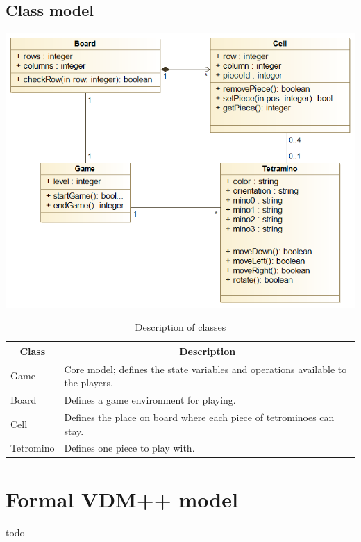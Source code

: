 \documentclass[a4paper]{article}
\begin{document}
\subsection{Class model}

\begin{center}
	\includegraphics[scale=0.4]{resources/img/uml}
	\label{uml}
\end{center}

\begin{table}[!h]
	\centering
	\label{description-classes}
	\begin{tabular}{|l|l|}
	\hline
	\multicolumn{1}{|c|}{\textbf{Class}} & \multicolumn{1}{|c|}{\textbf{Description}}	\\	\hline
	Game	&	Core model; defines the state variables and operations available to the players.	\\	\hline
	Board	&	Defines a game environment for playing. \\	\hline
	Cell	&	Defines the place on board where each piece of tetrominoes can stay. 	\\	\hline
	Tetromino	&	Defines one piece to play with.	\\	\hline
	\end{tabular}
	\caption{Description of classes}
\end{table}

\section{Formal VDM++ model}

todo
\end{document}
